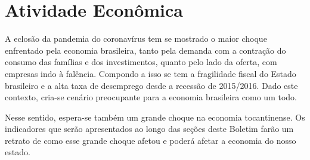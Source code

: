 \chapter{Atividade Econômica}
\par A eclosão da pandemia do coronavírus tem se mostrado o maior choque enfrentado pela economia brasileira, tanto pela demanda com a contração do consumo das famílias e dos investimentos, quanto pelo lado da oferta, com empresas indo à falência. Compondo a isso se tem a fragilidade fiscal do Estado brasileiro e a alta taxa de desemprego desde a recessão de 2015/2016. Dado este contexto, cria-se cenário preocupante para a economia brasileira como um todo.
\par Nesse sentido, espera-se também um grande choque na economia tocantinense. Os indicadores que serão apresentados ao longo das seções deste Boletim farão um retrato de como esse grande choque afetou e poderá afetar a economia do nosso estado.
